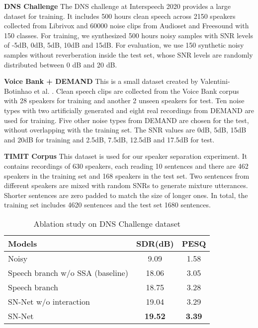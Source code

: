 \documentclass[letterpaper]{article} \usepackage{snnet}  \usepackage{times}  \usepackage{helvet} \usepackage{courier}  \usepackage[hyphens]{url}  \usepackage{graphicx} \urlstyle{rm} \def\UrlFont{\rm}  \usepackage{graphicx}  \usepackage{natbib}  \usepackage{caption} \usepackage{amsfonts}  \usepackage{amsmath}  \usepackage{multirow} \usepackage{tablefootnote}  \usepackage[switch]{lineno}
\begin{document}
\textbf{DNS Challenge} The DNS challenge \cite{reddy2020interspeech} at Interspeech 2020 provides a large dataset for training. It includes 500 hours clean speech across 2150 speakers collected from Librivox and 60000 noise clips from Audioset \cite{gemmeke2017audio} and Freesound with 150 classes. For training, we synthesized 500 hours noisy samples with SNR levels of -5dB, 0dB, 5dB, 10dB and 15dB. For evaluation, we use 150 synthetic noisy samples without reverberation inside the test set, whose SNR levels are randomly distributed between 0 dB and 20 dB.

\textbf{Voice Bank + DEMAND} This is a small dataset created by Valentini-Botinhao et al. \cite{valentini2016investigating}. Clean speech clips are collected from the Voice Bank corpus \cite{veaux2013voice} with 28 speakers for training and another 2 unseen speakers for test. Ten noise types with two artificially generated and eight real recordings from DEMAND \cite{thiemann2013diverse} are used for training. Five other noise types from DEMAND are chosen for the test, without overlapping with the training set. The SNR values are 0dB, 5dB, 15dB and 20dB for training and 2.5dB, 7.5dB, 12.5dB and 17.5dB for test. 

\textbf{TIMIT Corpus} This dataset is used for our speaker separation experiment. It contains recordings of 630 speakers, each reading 10 sentences and there are 462 speakers in the training set and 168 speakers in the test set. Two sentences from different speakers are mixed with random SNRs to generate mixture utterances. Shorter sentences are zero padded to match the size of longer ones. In total, the training set includes 4620 sentences and the test set 1680 sentences.

\begin{table}[t]
    \centering
    \begin{tabular}{lrcc}
        \hline
        \multicolumn{2}{l}{\textbf{Models}} & \textbf{SDR(dB)} & \textbf{PESQ}\\
        \hline
        \multicolumn{2}{l}{Noisy} & 9.09 & 1.58\\
        \hline
        \multicolumn{2}{l}{Speech branch w/o SSA (baseline)} & 18.06 & 3.05\\
        \multicolumn{2}{l}{Speech branch} & 18.75 & 3.28\\
        \hline
        \multicolumn{2}{l}{SN-Net w/o interaction} & 19.04 & 3.29 \\
        \multicolumn{2}{l}{SN-Net} & \textbf{19.52} & \textbf{3.39} \\
        \hline
    \end{tabular}
    \caption{Ablation study on DNS Challenge dataset}
    \label{table1}
\end{table}
\end{document}
